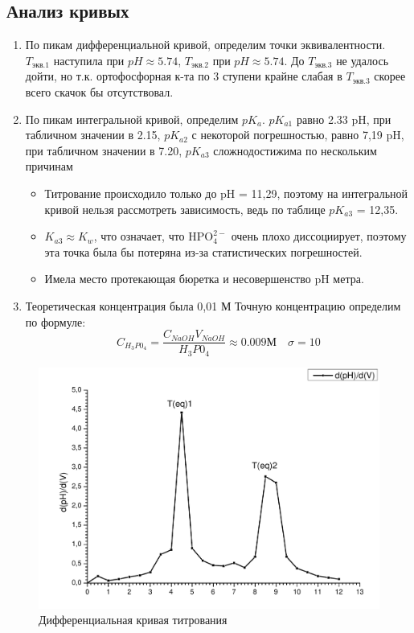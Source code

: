 \documentclass[a4paper,12pt]{article}
\begin{document}
\subsection{Анализ кривых}
\begin{enumerate}
\item По пикам дифференциальной кривой, определим точки эквивалентности. $T_{экв.1}$ наступила при $pH \approx 5.74$, $T_{экв.2}$ при $pH \approx 5.74$. До $T_{экв.3}$ не удалось дойти, но т.к. ортофосфорная к-та по 3 ступени крайне слабая в $T_{экв.3}$ скорее всего скачок бы отсутствовал.
\item По пикам интегральной кривой, определим $pK_{a}$. 
$pK_{a1}$ равно 2.33 pH, при табличном значении в 2.15, $pK_{a2}$ с некоторой погрешностью, равно 7,19 pH, при табличном значении в 7.20, $pK_{a3}$ сложнодостижима по нескольким причинам
\begin{itemize}
\item Титрование происходило только до pH = 11,29, поэтому на интегральной кривой нельзя рассмотреть зависимость, ведь по таблице $pK_{a3}$ = 12,35. 
\item $K_{a3}\approx K_{w}$, что означает, что $\mathrm{HPO_4^{2-}}$ очень плохо диссоциирует, поэтому эта точка была бы потеряна из-за статистических погрешностей.
\item Имела место протекающая бюретка и несовершенство pH метра.
\end{itemize}
\item Теоретическая концентрация была 0,01 М Точную концентрацию определим по формуле:
\begin{equation}
C_{H_3P0_4} = \dfrac{C_{NaOH}V_{NaOH}}{H_3P0_4}\approx0.009 М \quad \sigma=10%
\end{equation}
\end{enumerate}
\begin{figure}[H]

\centering

\includegraphics[scale=0.45]{diff.pdf}

\caption{Дифференциальная кривая титрования}

\label{fig:mpr}
\end{figure} 
\end{document}
